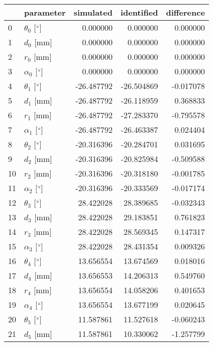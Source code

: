 \documentclass{standalone}%
\begin{document}
%
\normalsize%
\begin{tabular}{llrrr}
\toprule
{} &                 parameter &  simulated & identified & difference \\
\midrule
0  &  $\theta_{0}$ [$\degree$] &   0.000000 &   0.000000 &   0.000000 \\
1  &              $d_{0}$ [mm] &   0.000000 &   0.000000 &   0.000000 \\
2  &              $r_{0}$ [mm] &   0.000000 &   0.000000 &   0.000000 \\
3  &  $\alpha_{0}$ [$\degree$] &   0.000000 &   0.000000 &   0.000000 \\
4  &  $\theta_{1}$ [$\degree$] & -26.487792 & -26.504869 &  -0.017078 \\
5  &              $d_{1}$ [mm] & -26.487792 & -26.118959 &   0.368833 \\
6  &              $r_{1}$ [mm] & -26.487792 & -27.283370 &  -0.795578 \\
7  &  $\alpha_{1}$ [$\degree$] & -26.487792 & -26.463387 &   0.024404 \\
8  &  $\theta_{2}$ [$\degree$] & -20.316396 & -20.284701 &   0.031695 \\
9  &              $d_{2}$ [mm] & -20.316396 & -20.825984 &  -0.509588 \\
10 &              $r_{2}$ [mm] & -20.316396 & -20.318180 &  -0.001785 \\
11 &  $\alpha_{2}$ [$\degree$] & -20.316396 & -20.333569 &  -0.017174 \\
12 &  $\theta_{3}$ [$\degree$] &  28.422028 &  28.389685 &  -0.032343 \\
13 &              $d_{3}$ [mm] &  28.422028 &  29.183851 &   0.761823 \\
14 &              $r_{3}$ [mm] &  28.422028 &  28.569345 &   0.147317 \\
15 &  $\alpha_{3}$ [$\degree$] &  28.422028 &  28.431354 &   0.009326 \\
16 &  $\theta_{4}$ [$\degree$] &  13.656554 &  13.674569 &   0.018016 \\
17 &              $d_{4}$ [mm] &  13.656553 &  14.206313 &   0.549760 \\
18 &              $r_{4}$ [mm] &  13.656554 &  14.058206 &   0.401653 \\
19 &  $\alpha_{4}$ [$\degree$] &  13.656554 &  13.677199 &   0.020645 \\
20 &  $\theta_{5}$ [$\degree$] &  11.587861 &  11.527618 &  -0.060243 \\
21 &              $d_{5}$ [mm] &  11.587861 &  10.330062 &  -1.257799 \\

\end{tabular}
\end{document}
